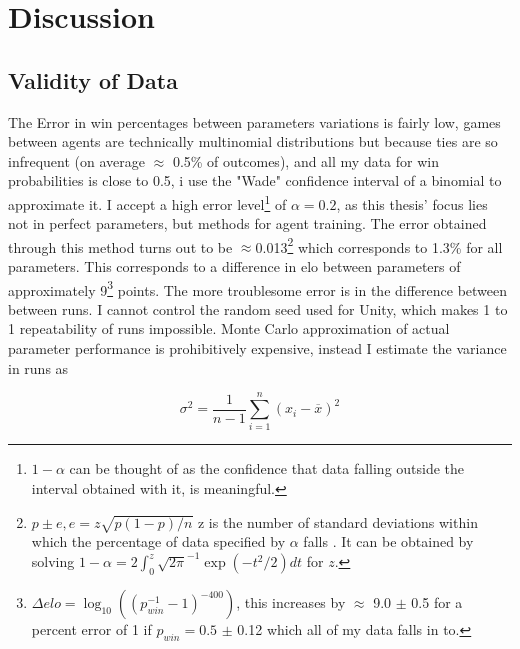 \chapter{Discussion}\label{chap:discussion}
\section{Validity of Data}\label{sec:disc:significance}
The Error in win percentages between parameters variations is fairly low, games between agents are technically multinomial distributions but because ties are so infrequent (on average $\approx$ 0.5\% of outcomes), and all my data for win probabilities is close to 0.5, i use the "Wade" confidence interval of a binomial\cite[p. 2]{binomial_confidence} to approximate it. I accept a high error level\footnote{$1-\alpha$ can be thought of as the confidence that data falling outside the interval obtained with it, is meaningful.} of $\alpha = 0.2$, as this thesis' focus lies not in perfect parameters, but methods for agent training. The error obtained through this method turns out to be $\approx$0.013\footnote{$p \pm e, e = z\sqrt{p(1-p)/n}$ z is the number of standard deviations within which the percentage of data specified by $\alpha$ falls \cite[p. 2]{binomial_confidence}. It can be obtained by solving $1-\alpha = 2\int_0^z \sqrt{2\pi}^{-1}\exp(-t^2/2)dt$ for $z$.} which corresponds to 1.3\% for all parameters. This corresponds to a difference in elo between parameters of approximately 9\footnote{$\Delta elo = \log_{10}\left(\left(p_{win}^{-1}-1\right)^{-400}\right)$, this increases by $\approx$ 9.0 $\pm$ 0.5 for a percent error of 1 if $p_{win} = 0.5$ $\pm$ 0.12 which all of my data falls in to.} points. The more troublesome error is in the difference between between runs. I cannot control the random seed used for Unity, which makes 1 to 1 repeatability of runs impossible. Monte Carlo approximation of actual parameter performance is prohibitively expensive, instead I estimate the variance in runs as

\begin{equation*}
    \sigma^2 = \frac{1}{n-1} \sum_{i=1}^{n} \left( x_i - \overline{x} \right)^2
\end{equation*}


